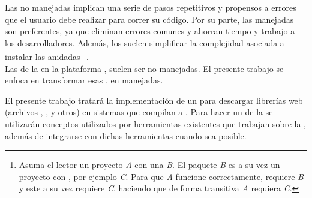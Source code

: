 Las \dependencies no manejadas implican una serie de pasos repetitivos y 
propensos a errores que el usuario debe realizar para correr su código. Por su 
parte, las \dependencies manejadas son preferentes, ya que eliminan errores 
comunes y ahorran tiempo y trabajo a los desarrolladores. Además, los \depmgrs 
suelen simplificar la complejidad asociada a instalar las \dependencies 
anidadas\footnote{
	Asuma el lector un proyecto \emph{A} con una \dependency \emph{B}. El 
	paquete \emph{B} es a su vez un proyecto con \dependencies, por ejemplo 
	\emph{C}. Para que \emph{A} funcione correctamente, requiere \emph{B} y 
	este a su vez requiere \emph{C}, haciendo que de forma transitiva \emph{A} 
	requiera \emph{C}.
} .\\
Las \dependencies de la \viewtier en la plataforma \java, suelen ser no 
manejadas. El presente trabajo se enfoca en transformar esas \dependencies, en 
\dependencies manejadas.\\

\jump[1]

El presente trabajo tratará la implementación de un \depmgrs para descargar 
librerías web (archivos \css, \js, y otros) en sistemas que compilan a 
\bytecode \java. Para hacer un \depmgr de la \viewtier se utilizarán conceptos 
utilizados por herramientas existentes que trabajan sobre la \logictier, además 
de integrarse con dichas herramientas cuando sea posible.